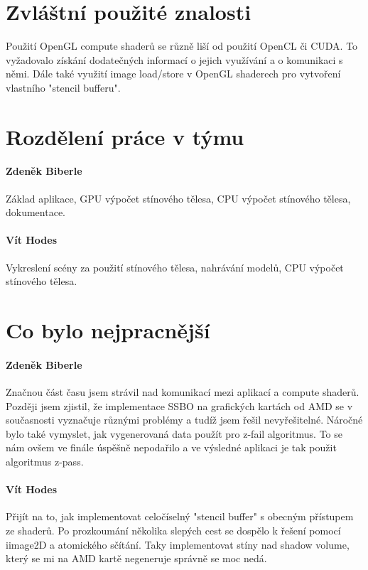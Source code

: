 \documentclass[11pt,a4paper]{article}
\begin{document}
\section{Zvláštní použité znalosti}

Použití OpenGL compute shaderů se různě liší od použití OpenCL či CUDA. To vyžadovalo získání dodatečných informací o jejich využívání a o komunikaci s němi. Dále také využití image load/store v OpenGL shaderech pro vytvoření vlastního "stencil bufferu".

\section{Rozdělení práce v týmu}

\paragraph{Zdeněk Biberle} Základ aplikace, GPU výpočet stínového tělesa, CPU výpočet stínového tělesa, dokumentace.
\paragraph{Vít Hodes} Vykreslení scény za použití stínového tělesa, nahrávání modelů, CPU výpočet stínového tělesa.

\section{Co bylo nejpracnější}

\paragraph{Zdeněk Biberle}
Značnou část času jsem strávil nad komunikací mezi aplikací a compute shaderů. Později jsem zjistil, že implementace SSBO na grafických kartách od AMD se v současnosti vyznačuje různými problémy a tudíž jsem řešil nevyřešitelné. Náročné bylo také vymyslet, jak vygenerovaná data použít pro z-fail algoritmus. To se nám ovšem ve finále úspěšně nepodařilo a ve výsledné aplikaci je tak použit algoritmus z-pass.

\paragraph{Vít Hodes} Přijít na to, jak implementovat celočíselný "stencil buffer" s obecným přístupem ze shaderů. Po prozkoumání několika slepých cest se dospělo k řešení pomocí iimage2D a atomického sčítání. Taky implementovat stíny nad shadow volume, který se mi na AMD kartě negeneruje správně se moc nedá.
\end{document}
